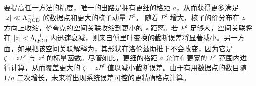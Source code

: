 要提高任一方法的精度，唯一的出路是拥有更细的格距 $a$，从而获得更多满足 $|z|\ll \Lambda_{\rm QCD}^{-1}$ 的数据点和更大的核子动量 $P^z$。
随着 $P^z$ 增大，核子的价分布在 $z$ 方向上收缩，价夸克的空间关联收缩到更小的 $z$ 距离。若 $P^z$ 足够大，空间关联将在 $|z|< \Lambda_{\rm QCD}^{-1}$ 内迅速衰减，则来自傅里叶变换的截断误差将显著减小。另一方面，如果把该空间关联解释为\spcorr，其形状在洛伦兹助推下不会改变，因为它是 $\zeta=zP^z$ 与 $z^2$ 的标量函数。尽管如此，更细的格距 $a$ 允许在更宽的 $P^z$ 范围内进行计算，从而覆盖更大的 $\zeta=zP^z$ 值以减小截断误差。由于有用数据点的数目随 $1/a$ 二次增长，未来将出现系统误差可控的更精确格点计算。

